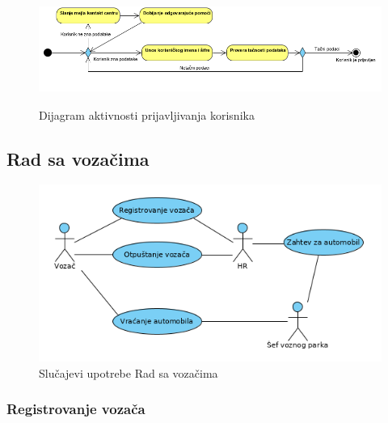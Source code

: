 \begin{figure}[H]
\begin{left}
\includegraphics[width=480,height=135]{Slike/PrijavljivanjeKorisnika.png}
\end{left}
    \caption{Dijagram aktivnosti prijavljivanja korisnika}
\label{fig:PrijavljivanjeKorisnika}
\end{figure}

\subsection{\bfseries Rad sa vozačima}

\begin{figure}[H]
\begin{center}
\includegraphics[width=\textwidth]{Slike/RadSaVozacimaUseCase.png}
\end{center}
    \caption{Slučajevi upotrebe Rad sa vozačima}
\label{fig:contextDiagram}
\end{figure}


\subsubsection{\bfseries Registrovanje vozača}

